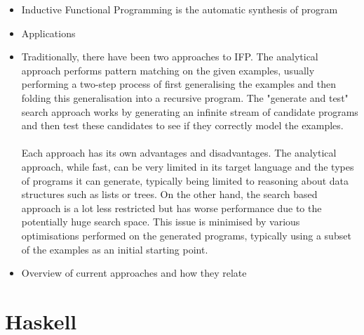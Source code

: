 \begin{itemize}
\item Inductive Functional Programming is the automatic synthesis of program
\item Applications
\item Traditionally, there have been two approaches to IFP. The analytical approach performs pattern matching on the given examples, usually performing a two-step process of first generalising the examples and then folding this generalisation into a recursive program. The "generate and test" search approach works by generating an infinite stream of candidate programs and then test these candidates to see if they correctly model the examples. \\ \\

Each approach has its own advantages and disadvantages. The analytical approach, while fast, can be very limited in its target language and the types of programs it can generate, typically being limited to reasoning about data structures such as lists or trees. On the other hand, the search based approach is a lot less restricted but has worse performance due to the potentially huge search space. This issue is minimised by various optimisations performed on the generated programs, typically using a subset of the examples as an initial starting point.
\item Overview of current approaches and how they relate 
\end{itemize}


\section{Haskell}

\pagebreak
\renewcommand\bibname{{References}}

